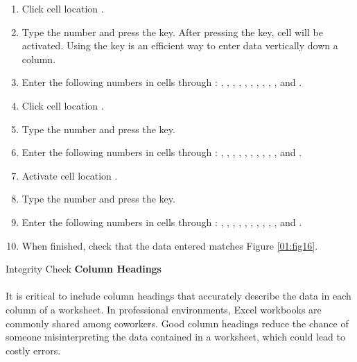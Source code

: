 \begin{enumerate}
	\item Click cell location .
	\item Type the number  and press the  key. After pressing the  key, cell  will be activated. Using the  key is an efficient way to enter data vertically down a column.
	\item Enter the following numbers in cells  through : , , , , , , , , , , and .
	\item Click cell location .
	\item Type the number  and press the  key.
	\item Enter the following numbers in cells  through : , , , , , , , , , , and .
	\item Activate cell location .
	\item Type the number  and press the  key.
	\item Enter the following numbers in cells  through : , , , , , , , , , , and .
	\item When finished, check that the data entered matches Figure \ref{01:fig16}.
\end{enumerate}

\begin{center}
	\begin{infobox}{Integrity Check}
		\textbf{Column Headings}
		\\
		\\
		It is critical to include column headings that accurately describe the data in each column of a worksheet. In professional environments, Excel workbooks are commonly shared among coworkers. Good column headings reduce the chance of someone misinterpreting the data contained in a worksheet, which could lead to costly errors.
	\end{infobox}
\end{center}

